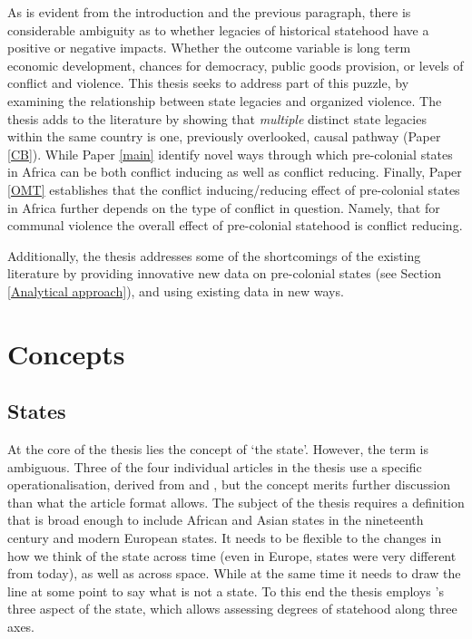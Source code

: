 As is evident from the introduction and the previous paragraph, there is
considerable ambiguity as to whether legacies of historical statehood have a
positive or negative impacts. Whether the outcome variable is long term economic
development, chances for democracy, public goods provision, or levels of
conflict and violence. This thesis seeks to address part of this puzzle, by
examining the relationship between state legacies and organized violence. The
thesis adds to the literature by showing that \textit{multiple} distinct state
legacies within the same country is one, previously overlooked, causal pathway
(Paper \ref{CB}). While Paper \ref{main} identify novel ways through which
pre-colonial states in Africa can be both conflict inducing as well as conflict
reducing. Finally, Paper \ref{OMT} establishes that the conflict
inducing/reducing effect of pre-colonial states in Africa further depends on the
type of conflict in question. Namely, that for communal violence the overall
effect of pre-colonial statehood is conflict reducing.

Additionally, the thesis addresses some of the shortcomings of the existing
literature by providing innovative new data on pre-colonial states (see Section
\ref{Analytical approach}), and using existing data in new ways.

\section{Concepts} \label{Concepts}

\subsection{States} \label{States}

At the core of the thesis lies the concept of `the state'. However, the term is
ambiguous. Three of the four individual articles in the thesis use a specific
operationalisation, derived from \citet{Butcher2019} and \citet{Butcher2017},
but the concept merits further discussion than what the article format allows.
The subject of the thesis requires a definition that is broad enough to include
African and Asian states in the nineteenth century and modern European states.
It needs to be flexible to the changes in how we think of the state across time
(even in Europe, states were very different from today), as well as across
space. While at the same time it needs to draw the line at some point to say
what is not a state. To this end the thesis employs \citet{Clapham1996}'s three
aspect of the state, which allows assessing degrees of statehood along three
axes.

